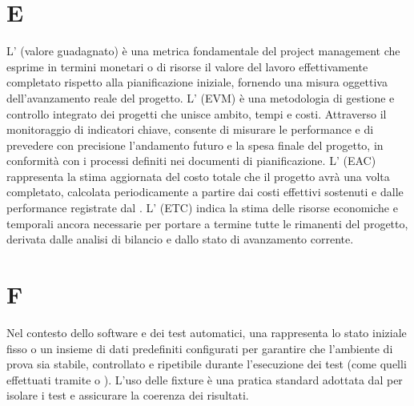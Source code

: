 \section{E}
L' (valore guadagnato) è una metrica fondamentale del project management che esprime in termini monetari o di risorse il valore del lavoro effettivamente completato rispetto alla pianificazione iniziale, fornendo una misura oggettiva dell'avanzamento reale del progetto.
L' (EVM) è una metodologia di gestione e controllo integrato dei progetti che unisce ambito, tempi e costi. Attraverso il monitoraggio di indicatori chiave, consente di misurare le performance e di prevedere con precisione l'andamento futuro e la spesa finale del progetto, in conformità con i processi definiti nei documenti di pianificazione.
L' (EAC) rappresenta la stima aggiornata del costo totale che il progetto avrà una volta completato, calcolata periodicamente a partire dai costi effettivi sostenuti e dalle performance registrate dal .
L' (ETC) indica la stima delle risorse economiche e temporali ancora necessarie per portare a termine tutte le  rimanenti del progetto, derivata dalle analisi di bilancio e dallo stato di avanzamento corrente.
\section{F}
Nel contesto dello  software e dei test automatici, una  rappresenta lo stato iniziale fisso o un insieme di dati predefiniti configurati per garantire che l'ambiente di prova sia stabile, controllato e ripetibile durante l'esecuzione dei test (come quelli effettuati tramite  o ). L'uso delle fixture è una pratica standard adottata dal  per isolare i test e assicurare la coerenza dei risultati.
